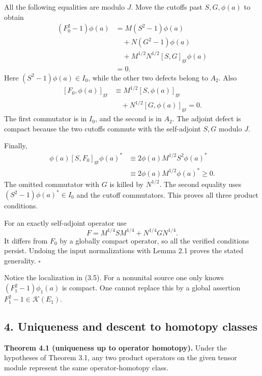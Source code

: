 \documentclass[
  11pt,
]{article}
\begin{document}
All the following equalities are modulo \(J\). Move the cutoffs past
\(S,G,\phi(a)\) to obtain \[
\begin{aligned}
(F_0^2-1)\phi(a)
&=M(S^2-1)\phi(a)\\
&\quad+N(G^2-1)\phi(a)\\
&\quad+M^{1/2}N^{1/2}[S,G]_{\mathrm{gr}}\phi(a)\\
&=0.
\end{aligned}
\tag{3.5}
\] Here \((S^2-1)\phi(a)\in I_0\), while the other two defects belong to
\(A_2\). Also \[
\begin{aligned}
\left[F_0,\phi(a)\right]_{\mathrm{gr}}
&\equiv M^{1/2}[S,\phi(a)]_{\mathrm{gr}}\\
&\quad+N^{1/2}[G,\phi(a)]_{\mathrm{gr}}=0.
\end{aligned}
\tag{3.6}
\] The first commutator is in \(I_0\), and the second is in \(A_2\). The
adjoint defect is compact because the two cutoffs commute with the
self-adjoint \(S,G\) modulo \(J\).

Finally, \[
\begin{aligned}
\phi(a)[S,F_0]_{\mathrm{gr}}\phi(a)^*
&\equiv2\phi(a)M^{1/2}S^2\phi(a)^*\\
&\equiv2\phi(a)M^{1/2}\phi(a)^*\geq0.
\end{aligned}
\tag{3.7}
\] The omitted commutator with \(G\) is killed by \(N^{1/2}\). The
second equality uses \((S^2-1)\phi(a)^*\in I_0\) and the cutoff
commutators. This proves all three product conditions.

For an exactly self-adjoint operator use \[
F=M^{1/4}SM^{1/4}+N^{1/4}GN^{1/4}.
\tag{3.8}
\] It differs from \(F_0\) by a globally compact operator, so all the
verified conditions persist. Undoing the input normalizations with Lemma
2.1 proves the stated generality. \(\square\)

Notice the localization in (3.5). For a nonunital source one only knows
\((F_1^2-1)\phi_1(a)\) is compact. One cannot replace this by a global
assertion \(F_1^2-1\in\mathcal K(E_1)\).

\subsection{4. Uniqueness and descent to homotopy
classes}\label{uniqueness-and-descent-to-homotopy-classes}

\textbf{Theorem 4.1 (uniqueness up to operator homotopy).} Under the
hypotheses of Theorem 3.1, any two product operators on the given tensor
module represent the same operator-homotopy class.
\end{document}
